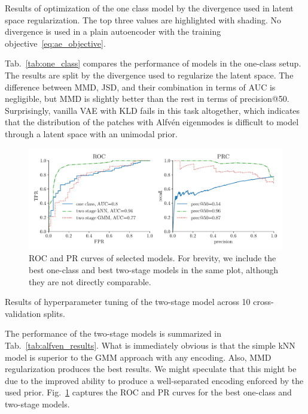 \begin{table}
  \centering
  
  \caption{Results of optimization of the one class model by the divergence used in latent space regularization. The top three values are highlighted with shading. No divergence is used in a plain autoencoder with the training objective~\eqref{eq:ae_objective}.}
  \label{tab:one_class}
\end{table}

Tab.~\ref{tab:one_class} compares the performance of models in the one-class setup. The results are split by the divergence used to regularize the latent space. The difference between MMD, JSD, and their combination in terms of AUC is negligible, but MMD is slightly better than the rest in terms of precision@50. Surprisingly, vanilla VAE with KLD fails in this task altogether, which indicates that the distribution of the patches with Alfvén eigenmodes is difficult to model through a latent space with an unimodal prior.

\begin{figure}
\begin{centering}
\includegraphics[scale=0.6]{data/chapter_alfven/roc_prc.pdf}
\end{centering}
\caption{ROC and PR curves of selected models. For brevity, we include the best one-class and best two-stage models in the same plot, although they are not directly comparable.}
\label{fig:roc_prc}
\end{figure}

\begin{table}
\centering

\caption{Results of hyperparameter tuning of the two-stage model across 10 cross-validation splits.}
\label{tab:alfven_results}
\end{table}

The performance of the two-stage models is summarized in Tab.~\ref{tab:alfven_results}. What is immediately obvious is that the simple kNN model is superior to the GMM approach with any encoding. Also, MMD regularization produces the best results. We might speculate that this might be due to the improved ability to produce a well-separated encoding enforced by the used prior. Fig.~\ref{fig:roc_prc} captures the ROC and PR curves for the best one-class and two-stage models.

